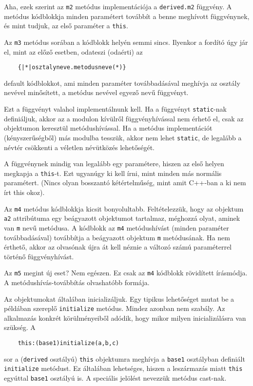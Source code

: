 Aha, ezek szerint az \verb!m2! metódus implementációja a \verb!derived.m2! függvény.
A metódus kódblokkja minden paramétert továbbít a benne meghívott függvénynek,
és mint tudjuk, az első paraméter a \verb!this!.

Az \verb!m3! metódus sorában a kódblokk helyén semmi sincs. 
Ilyenkor a fordító úgy jár el, mint az előző esetben, odateszi (odaérti) az
\begin{verbatim}
    {|*|osztalyneve.metodusneve(*)}
\end{verbatim}
default kódblokkot, ami minden paraméter továbbadásával meghívja
az osztály nevével minősített, a metódus nevével egyező nevű függvényt.

Ezt a függvényt valahol implementálnunk kell. 
Ha a függvényt \verb!static!-nak definiáljuk, akkor az a modulon kívülről 
függvényhívással nem érhető el, csak az objektumon keresztül metódushívással. 
Ha a metódus implementációt (kényszerűségből) más modulba tesszük, akkor nem lehet 
\verb!static!, de legalább a névtér csökkenti a véletlen névütközés lehetőségét.

A függvénynek mindig van legalább egy paramétere, hiszen az első helyen megkapja 
a \verb!this!-t. Ezt ugyanúgy ki kell írni, mint minden más normális paramétert.
(Nincs olyan bosszantó kétértelműség, mint amit C++-ban a ki nem írt this okoz). 

Az \verb!m4! metódus kódblokkja kicsit bonyolultabb.
Feltételezzük, hogy az objektum \verb!a2! attribútuma egy beágyazott
objektumot tartalmaz, méghozzá olyat, aminek van \verb!m! nevű metódusa.
A kódblokk az \verb!m4! metódushívást (minden paraméter továbbadásával) 
továbbítja a beágyazott objektum \verb!m! metódusának.
Ha nem érthető, akkor az olvasónak újra át kell néznie 
a változó számú paraméterrel történő függvényhívást.

Az \verb!m5! megint új eset? Nem egészen. Ez csak az \verb!m4! kódblokk 
rövidített írásmódja. A metódushívás-továbbítás olvashatóbb formája.

Az objektumokat általában inicializáljuk.
Egy tipikus lehetőséget mutat be a példában szereplő \verb!initialize! metódus.
Mindez azonban nem szabály. Az alkalmazás konkrét körülményeiből adódik, 
hogy mikor milyen inicializálásra van szükség. A
\begin{verbatim}
    this:(base1)initialize(a,b,c)
\end{verbatim}
sor a (\verb!derived! osztályú) \verb!this! objektumra meghívja
a \verb!base1! osztályban definiált \verb!initialize! metódust.
Ez általában lehetséges, hiszen a leszármazás miatt \verb!this!
egyúttal \verb!base1! osztályú is. A speciális jelölést nevezzük 
metódus cast-nak.

